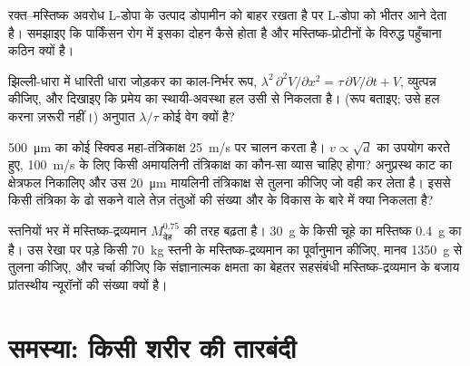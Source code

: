 \begin{exercise}[$\star\star$]\label{exo:b3:nervous-systems:9}
रक्त--मस्तिष्क अवरोध L-डोपा के उत्पाद डोपामीन को बाहर रखता है पर
L-डोपा को भीतर आने देता है। समझाइए कि पार्किंसन रोग में इसका दोहन कैसे
होता है और मस्तिष्क-प्रोटीनों के विरुद्ध  पहुँचाना कठिन क्यों है।
\end{exercise}

\begin{exercise}[$\star\star\star$]\label{exo:b3:nervous-systems:10}
झिल्ली-धारा में धारिती धारा जोड़कर  का काल-निर्भर रूप,
$\lambda^{2}\,\partial^{2}
V/\partial x^{2} = \tau\,\partial V/\partial t + V$, व्युत्पन्न कीजिए,
और दिखाइए कि प्रमेय का स्थायी-अवस्था हल उसी से निकलता है। (रूप बताइए;
उसे हल करना ज़रूरी नहीं।) अनुपात $\lambda/\tau$ कोई वेग क्यों है?
\end{exercise}

\begin{exercise}[$\star\star\star$]\label{exo:b3:nervous-systems:11}
\qty{500}{\micro m} का कोई स्क्विड महा-तंत्रिकाक्ष \qty{25}{m/s} पर
चालन करता है। $v \propto \sqrt{d}$ का उपयोग करते हुए, \qty{100}{m/s}
के लिए किसी अमायलिनी तंत्रिकाक्ष का कौन-सा व्यास चाहिए होगा? अनुप्रस्थ
काट का क्षेत्रफल निकालिए और उस \qty{20}{\micro m} मायलिनी
तंत्रिकाक्ष से तुलना कीजिए जो वही कर लेता है। इससे किसी तंत्रिका के ढो
सकने वाले तेज़ तंतुओं की संख्या और  के विकास के बारे में क्या
निकलता है?
\end{exercise}

\begin{exercise}[$\star\star\star$]\label{exo:b3:nervous-systems:12}
स्तनियों भर में मस्तिष्क-द्रव्यमान $M_{\text{देह}}^{0.75}$ की तरह
बढ़ता है। \qty{30}{g} के किसी चूहे का मस्तिष्क \qty{0.4}{g} का है। उस
रेखा पर पड़े किसी \qty{70}{kg} स्तनी के मस्तिष्क-द्रव्यमान का
पूर्वानुमान कीजिए, मानव \qty{1350}{g} से तुलना कीजिए, और चर्चा कीजिए कि
संज्ञानात्मक क्षमता का बेहतर सहसंबंधी मस्तिष्क-द्रव्यमान के बजाय
प्रांतस्थीय न्यूरॉनों की संख्या क्यों है।
\end{exercise}

\section{समस्या: किसी शरीर की तारबंदी}

